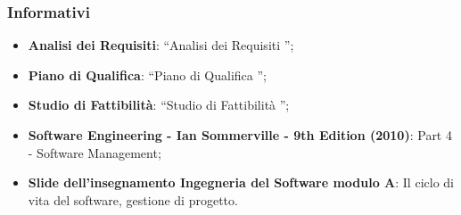 		\subsubsection{Informativi}
			\begin{itemize}
				\item \textbf{Analisi dei Requisiti}: “Analisi dei Requisiti \lastversion”;
				\item \textbf{Piano di Qualifica}: “Piano di Qualifica \lastversion”;
				\item \textbf{Studio di Fattibilità}: “Studio di Fattibilità \lastversion”;
				\item \textbf{Software Engineering - Ian Sommerville - 9th Edition (2010)}: Part 4 - Software Management;
				\item \textbf{Slide dell’insegnamento Ingegneria del Software modulo A}: Il ciclo di vita del software, gestione di progetto.
			\end{itemize}
